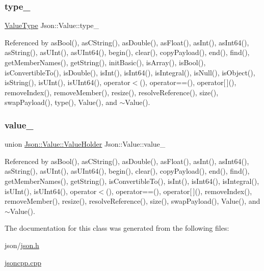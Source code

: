 \subsubsection{\texorpdfstring{type\+\_\+}{type\_}}
{\footnotesize\ttfamily \hyperlink{namespaceJson_a7d654b75c16a57007925868e38212b4e_a7d654b75c16a57007925868e38212b4e}{Value\+Type} Json\+::\+Value\+::type\+\_\+\hspace{0.3cm}{\ttfamily [private]}}



Referenced by as\+Bool(), as\+C\+String(), as\+Double(), as\+Float(), as\+Int(), as\+Int64(), as\+String(), as\+U\+Int(), as\+U\+Int64(), begin(), clear(), copy\+Payload(), end(), find(), get\+Member\+Names(), get\+String(), init\+Basic(), is\+Array(), is\+Bool(), is\+Convertible\+To(), is\+Double(), is\+Int(), is\+Int64(), is\+Integral(), is\+Null(), is\+Object(), is\+String(), is\+U\+Int(), is\+U\+Int64(), operator$<$(), operator==(), operator\mbox{[}$\,$\mbox{]}(), remove\+Index(), remove\+Member(), resize(), resolve\+Reference(), size(), swap\+Payload(), type(), Value(), and $\sim$\+Value().

\mbox{\label{classJson_1_1Value_aef578244546212705b9f81eb84d7e151_aef578244546212705b9f81eb84d7e151}} 
\subsubsection{\texorpdfstring{value\+\_\+}{value\_}}
{\footnotesize\ttfamily union \hyperlink{unionJson_1_1Value_1_1ValueHolder}{Json\+::\+Value\+::\+Value\+Holder}  Json\+::\+Value\+::value\+\_\+\hspace{0.3cm}{\ttfamily [private]}}



Referenced by as\+Bool(), as\+C\+String(), as\+Double(), as\+Float(), as\+Int(), as\+Int64(), as\+String(), as\+U\+Int(), as\+U\+Int64(), begin(), clear(), copy\+Payload(), end(), find(), get\+Member\+Names(), get\+String(), is\+Convertible\+To(), is\+Int(), is\+Int64(), is\+Integral(), is\+U\+Int(), is\+U\+Int64(), operator$<$(), operator==(), operator\mbox{[}$\,$\mbox{]}(), remove\+Index(), remove\+Member(), resize(), resolve\+Reference(), size(), swap\+Payload(), Value(), and $\sim$\+Value().



The documentation for this class was generated from the following files\+:\begin{DoxyCompactItemize}
\item 
json/\hyperlink{json_8h}{json.\+h}\item 
\hyperlink{jsoncpp_8cpp}{jsoncpp.\+cpp}\end{DoxyCompactItemize}
